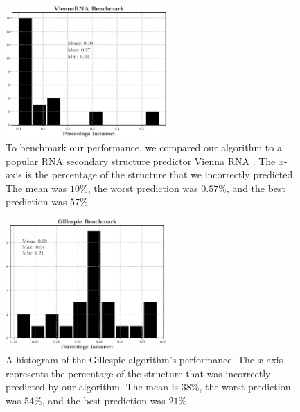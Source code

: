 \documentclass[11pt]{article}
\begin{document}
\begin{multicols}{2}
\begin{figure}[H]
\centering
\includegraphics[width = 0.55\textwidth]{fig/v_rna_bench}
\caption{To benchmark our performance, we compared our algorithm to a popular RNA secondary structure predictor Vienna RNA \cite{Lorenz2011}. The $x$-axis is the percentage of the structure that we incorrectly predicted. The mean was $10\%$, the worst prediction was $0.57\%$, and the best prediction was $57\%$. }
\label{fig:vbench}
\end{figure}

\begin{figure}[H]
\centering
\includegraphics[width = 0.55\textwidth]{fig/gill_bench}
\caption{A histogram of the Gillespie algorithm's performance. The $x$-axis represents the percentage of the structure that was incorrectly predicted by our algorithm. The mean is $38 \%$, the worst prediction  was $54\%$, and the best prediction was $21 \%$.}
\label{fig:gill}
\end{figure}
\end{multicols}
\end{document}

